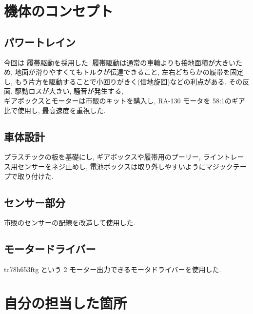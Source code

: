 \documentclass[
]{ltjarticle}
\date{}
\begin{document}
\section{機体のコンセプト}
\subsection{パワートレイン}
今回は 履帯駆動を採用した. 履帯駆動は通常の車輪よりも接地面積が大きいため, 地面が滑りやすくてもトルクが伝達できること, 左右どちらかの履帯を固定し, もう片方を駆動することで小回りがきく(信地旋回)などの利点がある. その反面, 駆動ロスが大きい, 騒音が発生する, \\ギアボックスとモーターは市販のキットを購入し, RA-130 モータを 58:1のギア比で使用し, 最高速度を重視した. 
\subsection{車体設計}
プラスチックの板を基礎にし, ギアボックスや履帯用のプーリー, ライントレース用センサーをネジ止めし, 電池ボックスは取り外しやすいようにマジックテープで取り付けた. 
\subsection{センサー部分}
市販のセンサーの配線を改造して使用した. 
\subsection{モータードライバー}
tc78h653ftg という 2 モーター出力できるモータドライバーを使用した. 
\section{自分の担当した箇所}
\end{document}
